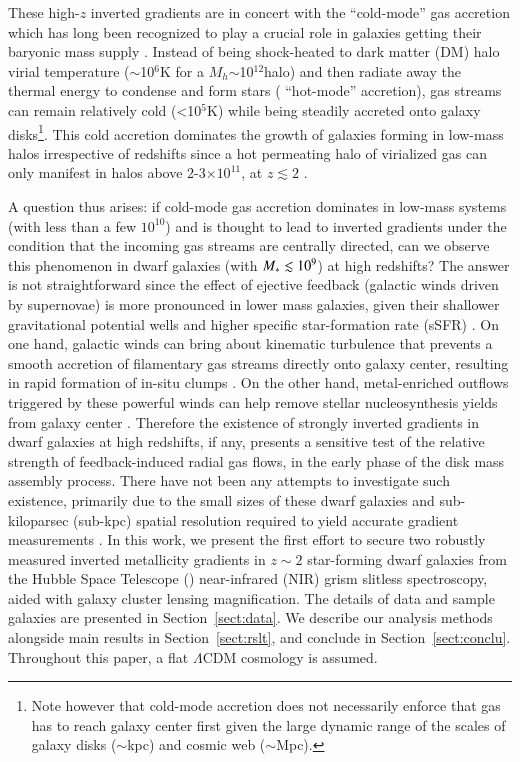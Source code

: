 These high-$z$ inverted gradients are in concert with the ``cold-mode'' gas accretion which has long been recognized to play a
crucial role in galaxies getting their baryonic mass supply
\citep{Birnboim:2003fo,Keres:2005gb,Dekel:2006cn,Dekel:2009fz,2009MNRAS.395..160K}.
Instead of being shock-heated to dark matter (DM) halo virial temperature ($\sim$10$^6$K for a $M_{
h}$$\sim$10$^{12}$\Msun halo) and then radiate away the thermal energy to condense and form stars (\vsv 
``hot-mode'' accretion),
gas streams can remain relatively cold (<10$^5$K) while being steadily accreted onto galaxy 
disks\footnote{Note however that
cold-mode accretion does not necessarily enforce that gas has to reach galaxy center first
given the large dynamic range of the scales of galaxy disks ($\sim$kpc) and cosmic web ($\sim$Mpc).}.
This cold accretion dominates the growth of galaxies forming in low-mass halos irrespective of redshifts since a hot permeating
halo of virialized gas can only manifest in halos above 2-3$\times10^{11}$\Msun, at $z\lesssim2$
\citep{Birnboim:2003fo,Keres:2005gb}.

A question thus arises: if cold-mode gas accretion dominates in low-mass systems (with \Mstar less than a few
$10^{10}$\Msun) and is thought to lead to inverted gradients under the condition that the incoming gas streams 
are centrally directed, can we observe this phenomenon in dwarf galaxies (with $M_\ast\lesssim10^9$) at high 
redshifts?
The answer is not straightforward since the effect of ejective feedback (\eg galactic winds driven by supernovae) is more
pronounced in lower mass galaxies, given their shallower gravitational potential wells and higher specific
star-formation rate (sSFR) \citep[see \eg][]{GalaxiesonFIREFe:2014dn,2014Natur.509..177V}.
On one hand, galactic winds can bring about kinematic turbulence that prevents a smooth accretion of 
filamentary gas streams directly onto galaxy center, resulting in rapid formation of in-situ clumps 
\citep{Dekel:2009bn}.
On the other hand, metal-enriched outflows triggered by these powerful winds can help remove stellar nucleosynthesis yields from
galaxy center \citep{Tremonti:2004ed,Erb:2006kn}.
Therefore the existence of strongly inverted gradients in dwarf galaxies at high redshifts, if any, presents a sensitive test of 
the relative strength of feedback-induced radial gas flows, in the early phase of the disk mass assembly process.
There have not been any attempts to investigate such existence, primarily due to the small sizes of these 
dwarf galaxies and sub-kiloparsec (sub-kpc) spatial resolution required to yield accurate gradient 
measurements \citep{2013ApJ...767..106Y}.
In this work, we present the first effort to secure two robustly measured inverted metallicity gradients in $z\sim2$ star-forming
dwarf galaxies from the Hubble Space Telescope (\hst) near-infrared (NIR) grism slitless spectroscopy, aided 
with galaxy cluster lensing magnification.
The details of data and sample galaxies are presented in Section~\ref{sect:data}. We describe our analysis methods alongside main 
results in Section~\ref{sect:rslt}, and conclude in Section~\ref{sect:conclu}.
Throughout this paper, a flat $\Lambda$CDM cosmology is assumed.


